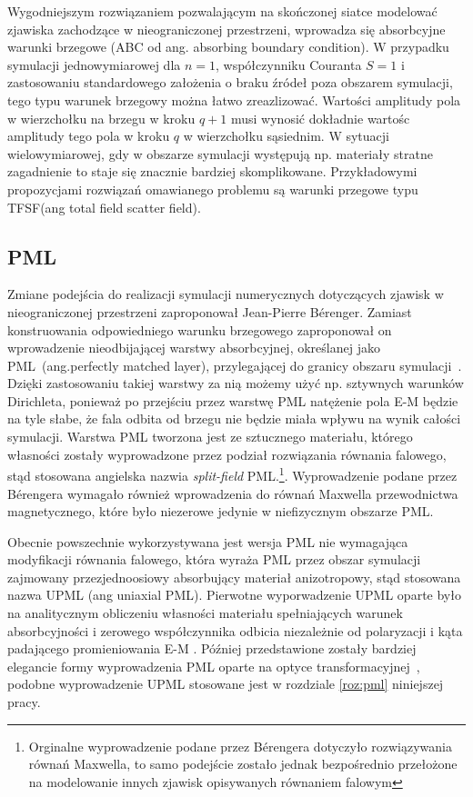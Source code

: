 Wygodniejszym rozwiązaniem pozwalającym na skończonej siatce modelować zjawiska zachodzące w nieograniczonej przestrzeni, wprowadza się absorbcyjne warunki brzegowe (ABC od ang. absorbing boundary condition). W przypadku symulacji jednowymiarowej dla $n=1$, współczynniku Couranta $S=1$ i zastosowaniu standardowego założenia o braku źródeł poza obszarem symulacji, tego typu warunek brzegowy można łatwo zreazlizować. Wartości amplitudy pola w wierzchołku na brzegu w kroku $q+1$ musi wynosić dokładnie wartośc amplitudy tego pola w kroku $q$ w wierzchołku sąsiednim. W sytuacji wielowymiarowej, gdy w obszarze symulacji występują np. materiały stratne zagadnienie to staje się znacznie bardziej skomplikowane. Przykładowymi propozycjami rozwiązań omawianego problemu są warunki przegowe typu TFSF(ang total field scatter field).

\subsection{PML}
\label{art:pml}
Zmiane podejścia do realizacji symulacji numerycznych dotyczących zjawisk w nieograniczonej przestrzeni zaproponował Jean-Pierre B\'{e}renger. Zamiast konstruowania odpowiedniego warunku brzegowego zaproponował on wprowadzenie nieodbijającej warstwy absorbcyjnej, określanej jako PML~(ang.perfectly matched layer), przylegającej do granicy obszaru symulacji~\cite{1994JCoPh.114..185B}. Dzięki zastosowaniu takiej warstwy za nią możemy użyć np. sztywnych warunków Dirichleta, ponieważ po przejściu przez warstwę PML natężenie pola E-M będzie na tyle słabe, że fala odbita od brzegu nie będzie miała wpływu na wynik całości symulacji. Warstwa PML tworzona jest ze sztucznego materiału, którego własności zostały wyprowadzone przez podział rozwiązania równania falowego,  stąd stosowana angielska nazwia {\it split-field} PML.\footnote{Orginalne wyprowadzenie podane przez B\'{e}rengera dotyczyło rozwiązywania równań Maxwella, to samo podejście zostało jednak bezpośrednio przełożone na modelowanie innych zjawisk opisywanych równaniem falowym}.  Wyprowadzenie podane przez B\'{e}rengera  wymagało również wprowadzenia do równań Maxwella przewodnictwa magnetycznego, które było niezerowe jedynie w niefizycznym obszarze PML.

Obecnie powszechnie wykorzystywana jest wersja PML nie wymagająca modyfikacji równania falowego, która wyraża PML przez obszar symulacji zajmowany przezjednoosiowy absorbujący materiał anizotropowy, stąd stosowana nazwa UPML (ang uniaxial PML). Pierwotne wyporwadzenie UPML oparte było na analitycznym obliczeniu własności materiału spełniających warunek absorbcyjności i zerowego współczynnika odbicia niezależnie od polaryzacji i kąta padającego promieniowania E-M  \cite{sacks1995perfectly}. Później przedstawione zostały bardziej elegancie formy wyprowadzenia PML oparte na optyce transformacyjnej~\cite{rappaport1995perfectly}, podobne wyprowadzenie UPML stosowane jest w rozdziale \ref{roz:pml} niniejszej pracy.


